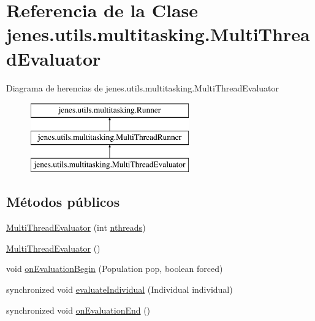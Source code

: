 \hypertarget{classjenes_1_1utils_1_1multitasking_1_1_multi_thread_evaluator}{\section{Referencia de la Clase jenes.\-utils.\-multitasking.\-Multi\-Thread\-Evaluator}
\label{classjenes_1_1utils_1_1multitasking_1_1_multi_thread_evaluator}
}
Diagrama de herencias de jenes.\-utils.\-multitasking.\-Multi\-Thread\-Evaluator\begin{figure}[H]
\begin{center}
\leavevmode
\includegraphics[height=3.000000cm]{classjenes_1_1utils_1_1multitasking_1_1_multi_thread_evaluator}
\end{center}
\end{figure}
\subsection*{Métodos públicos}
\begin{DoxyCompactItemize}
\item 
\hyperlink{classjenes_1_1utils_1_1multitasking_1_1_multi_thread_evaluator_a842d648ae03a8d7f835a24c522d229ae}{Multi\-Thread\-Evaluator} (int \hyperlink{classjenes_1_1utils_1_1multitasking_1_1_multi_thread_runner_aa20fe700a6b2abd3694b4a1d5629db8f}{nthreads})
\item 
\hyperlink{classjenes_1_1utils_1_1multitasking_1_1_multi_thread_evaluator_ac9949bf8de0efb0cb47feb2df56140ff}{Multi\-Thread\-Evaluator} ()
\item 
void \hyperlink{classjenes_1_1utils_1_1multitasking_1_1_multi_thread_evaluator_a2a9d9427ca8c2b8a9dfc541c85bada42}{on\-Evaluation\-Begin} (Population pop, boolean forced)
\item 
synchronized void \hyperlink{classjenes_1_1utils_1_1multitasking_1_1_multi_thread_evaluator_ad99c13b137f1089a9f30377548b42e25}{evaluate\-Individual} (Individual individual)
\item 
synchronized void \hyperlink{classjenes_1_1utils_1_1multitasking_1_1_multi_thread_evaluator_a3cd56b43989da43e4b3c2b79260d5f5f}{on\-Evaluation\-End} ()
\end{DoxyCompactItemize}
